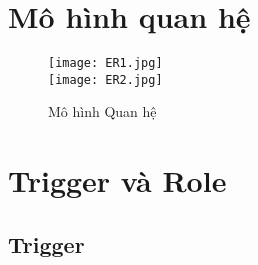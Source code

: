 \documentclass[a4paper,12pt]{article}
\begin{document}
\section{Mô hình quan hệ}
\begin{figure}[tbh]
    \centering
    \texttt{[image: ER1.jpg]} 
\\ [1cm]
    \texttt{[image: ER2.jpg]}
    \caption{Mô hình Quan hệ}
    \label{ERD}
\end{figure}
\newpage
\section{Trigger và Role}
\subsection{Trigger}
\end{document}

